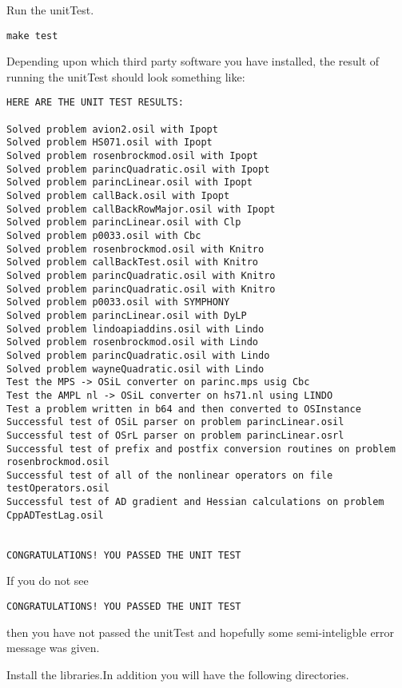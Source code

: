 \documentclass[11pt]{article}
\renewcommand{\_}{{\char"5F}}
\renewcommand{\{}{{\char"7B}}
\renewcommand{\}}{{\char"7D}}
\renewcommand{\^}{{\char"0D}}
\renewcommand{\'}{{\char"0D}}
\begin{document}
 Run the unitTest.

\begin{verbatim}
make test
\end{verbatim}

Depending upon which third party software you have installed, the result of running the unitTest should look something like:


{\small
\begin{verbatim}
HERE ARE THE UNIT TEST RESULTS:

Solved problem avion2.osil with Ipopt
Solved problem HS071.osil with Ipopt
Solved problem rosenbrockmod.osil with Ipopt
Solved problem parincQuadratic.osil with Ipopt
Solved problem parincLinear.osil with Ipopt
Solved problem callBack.osil with Ipopt
Solved problem callBackRowMajor.osil with Ipopt
Solved problem parincLinear.osil with Clp
Solved problem p0033.osil with Cbc
Solved problem rosenbrockmod.osil with Knitro
Solved problem callBackTest.osil with Knitro
Solved problem parincQuadratic.osil with Knitro
Solved problem parincQuadratic.osil with Knitro
Solved problem p0033.osil with SYMPHONY
Solved problem parincLinear.osil with DyLP
Solved problem lindoapiaddins.osil with Lindo
Solved problem rosenbrockmod.osil with Lindo
Solved problem parincQuadratic.osil with Lindo
Solved problem wayneQuadratic.osil with Lindo
Test the MPS -> OSiL converter on parinc.mps usig Cbc
Test the AMPL nl -> OSiL converter on hs71.nl using LINDO
Test a problem written in b64 and then converted to OSInstance
Successful test of OSiL parser on problem parincLinear.osil
Successful test of OSrL parser on problem parincLinear.osrl
Successful test of prefix and postfix conversion routines on problem rosenbrockmod.osil
Successful test of all of the nonlinear operators on file testOperators.osil
Successful test of AD gradient and Hessian calculations on problem CppADTestLag.osil


CONGRATULATIONS! YOU PASSED THE UNIT TEST
\end{verbatim}
}

If you do not see
\begin{verbatim}
CONGRATULATIONS! YOU PASSED THE UNIT TEST
\end{verbatim}
then you have not passed the unitTest and hopefully some semi-inteligble error message was given. 

\vskip 8pt

  Install the libraries.In addition you will have the following directories.
\end{document}
